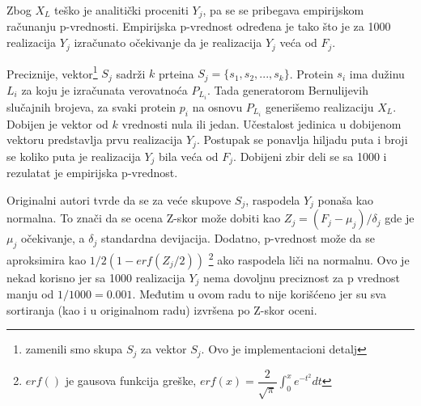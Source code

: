 Zbog $X_L$ teško je analitički proceniti $Y_j$, pa se se pribegava empirijskom
računanju p-vrednosti. Empirijska p-vrednost određena je tako što je za 1000
realizacija $Y_j$ izračunato očekivanje da je realizacija $Y_j$ veća od $F_j$.

Preciznije, vektor\footnote{zamenili smo skupa $S_j$ za vektor $S_j$. Ovo je implementacioni detalj}
$S_j$ sadrži $k$ prteina $S_j=\{s_1, s_2, ... ,s_{k}\}$.
Protein $s_i$ ima dužinu $L_i$ za koju je izračunata verovatnoća $P_{L_i}$.
Tada generatorom Bernulijevih slučajnih brojeva, za svaki protein $p_i$ na
osnovu $P_{L_i}$ generišemo realizaciju $X_L$. Dobijen je vektor od $k$ vrednosti nula ili
jedan. Učestalost jedinica u dobijenom vektoru predstavlja prvu realizacija $Y_j$.
Postupak se ponavlja hiljadu puta i broji se koliko puta je realizacija $Y_j$
bila veća od $F_j$. Dobijeni zbir deli se sa 1000 i rezulatat je empirijska
p-vrednost.


Originalni autori tvrde da se za veće skupove $S_j$, raspodela
$Y_j$ ponaša kao normalna. To znači da se ocena Z-skor može dobiti kao
$Z_j=(F_j-\mu_j)/\delta_j$ gde je $\mu_j$ očekivanje, a $\delta_j$ standardna
devijacija.  Dodatno, p-vrednost može da se aproksimira kao $1/2(1-erf(Z_j/2))$
\footnote{$erf()$ je gausova funkcija greške,
$erf(x)=\dfrac{2}{\sqrt{\pi}} \int_{0}^{x}  e^{-t^2} dt$ }
ako raspodela liči na normalnu. Ovo je nekad korisno jer sa 1000 realizacija
$Y_j$ nema dovoljnu preciznost za p vrednost manju od $1/1000=0.001$. Međutim u
ovom radu to nije korišćeno jer su sva sortiranja (kao i u originalnom radu)
izvršena po Z-skor oceni.


